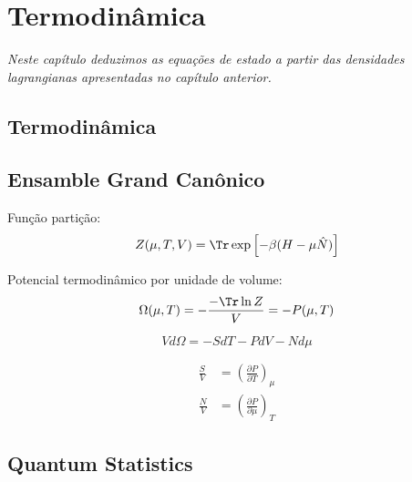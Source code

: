 \chapter{Termodinâmica}

\begin{fullwidth}\it
Neste capítulo deduzimos as equações de estado a partir das densidades lagrangianas apresentadas no capítulo anterior.
\end{fullwidth}

%

\section{Termodinâmica}

\section{Ensamble Grand Canônico}

Função partição:
\begin{equation}
	Z(\mu, T, V) = \Tr \exp\left[-\beta(H-\mu\hat{N})\right]
\end{equation}

Potencial termodinâmico por unidade de volume:
\begin{equation}
	\Omega(\mu, T) = -\frac{-\Tr\ln Z}{V} = -P(\mu,T)
\end{equation}

\begin{equation}
	Vd\Omega = -S dT - PdV - Nd\mu
\end{equation}

\begin{align}
	\frac{S}{V} &= \left(\frac{\partial P}{\partial T}\right)_\mu \\
	\frac{N}{V} &= \left(\frac{\partial P}{\partial\mu}\right)_T
\end{align}

\section{Quantum Statistics}
